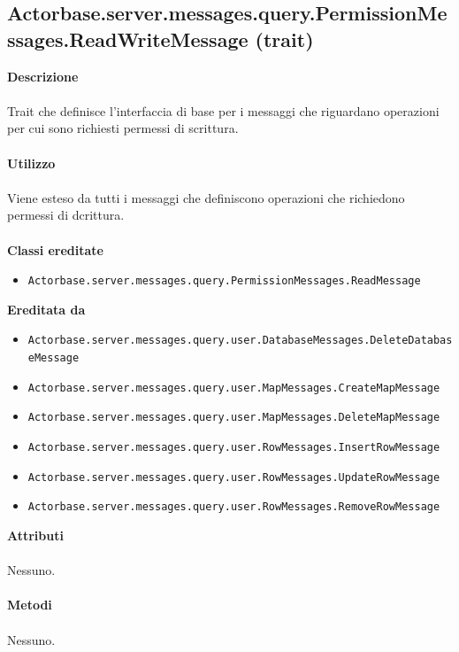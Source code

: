 \documentclass[a4paper]{article}
\begin{document}
\subsection{Actorbase.server.messages.query.PermissionMessages.ReadWriteMessage (trait)}
		\textbf{Descrizione}
			\\ \\
			Trait che definisce l'interfaccia di base per i messaggi che riguardano operazioni per cui sono richiesti permessi di scrittura.
			\\ \\
		\textbf{Utilizzo}
			\\ \\
			Viene esteso da tutti i messaggi che definiscono operazioni che richiedono permessi di dcrittura.
			\\ \\
		\textbf{Classi ereditate}
			\begin{itemize}
				\item \texttt{Actorbase.server.messages.query.PermissionMessages.ReadMessage}
			\end{itemize}
		\textbf{Ereditata da}
			\begin{itemize}
				\item \texttt{Actorbase.server.messages.query.user.DatabaseMessages.DeleteDatabaseMessage}
				\item \texttt{Actorbase.server.messages.query.user.MapMessages.CreateMapMessage}
				\item \texttt{Actorbase.server.messages.query.user.MapMessages.DeleteMapMessage}
				\item \texttt{Actorbase.server.messages.query.user.RowMessages.InsertRowMessage}
				\item \texttt{Actorbase.server.messages.query.user.RowMessages.UpdateRowMessage}
				\item \texttt{Actorbase.server.messages.query.user.RowMessages.RemoveRowMessage}
			\end{itemize}
		\textbf{Attributi}
			\\ \\
			Nessuno.
			\\ \\
		\textbf{Metodi}
			\\ \\
			Nessuno.

			
\end{document}
